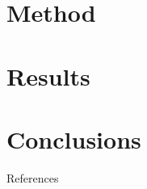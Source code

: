 \documentclass[xcolor=dvipsnames]{beamer} %
\begin{document}
% 

\section{Method}



\section{Results}


\section{Conclusions}


\appendix  %

\begin{frame}{References}

  \begin{footnotesize}
    \printbibliography[heading=none]
  \end{footnotesize}

\end{frame}


\end{document}
